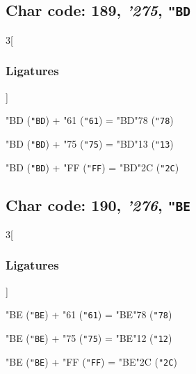 \documentclass{article}
\newlength{\maxcharwidth}
\begin{document}
\subsection{Char code: 189, {\it'275}, {\tt"BD}}
\label{char_189}


\begin{multicols}{3}[\subsubsection{Ligatures}]

{\testfont\char"BD\noboundary} ({\tt"BD}) + {\testfont\char"61\noboundary} ({\tt"61}) = {\testfont\char"BD\noboundary}{\testfont\char"78\noboundary} ({\tt"78}) 

{\testfont\char"BD\noboundary} ({\tt"BD}) + {\testfont\char"75\noboundary} ({\tt"75}) = {\testfont\char"BD\noboundary}{\testfont\char"13\noboundary} ({\tt"13}) 

{\testfont\char"BD\noboundary} ({\tt"BD}) + {\testfont\char"FF\noboundary} ({\tt"FF}) = {\testfont\char"BD\noboundary}{\testfont\char"2C\noboundary} ({\tt"2C}) 

\end{multicols}

\subsection{Char code: 190, {\it'276}, {\tt"BE}}
\label{char_190}


\begin{multicols}{3}[\subsubsection{Ligatures}]

{\testfont\char"BE\noboundary} ({\tt"BE}) + {\testfont\char"61\noboundary} ({\tt"61}) = {\testfont\char"BE\noboundary}{\testfont\char"78\noboundary} ({\tt"78}) 

{\testfont\char"BE\noboundary} ({\tt"BE}) + {\testfont\char"75\noboundary} ({\tt"75}) = {\testfont\char"BE\noboundary}{\testfont\char"12\noboundary} ({\tt"12}) 

{\testfont\char"BE\noboundary} ({\tt"BE}) + {\testfont\char"FF\noboundary} ({\tt"FF}) = {\testfont\char"BE\noboundary}{\testfont\char"2C\noboundary} ({\tt"2C}) 

\end{multicols}
\end{document}
